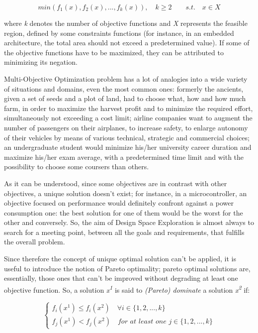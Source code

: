 \begin{equation}
        min( f_1(x), f_2(x), ..., f_k(x) ), \quad k \ge 2 \qquad s.t. \quad x \in X
\end{equation}

where \textit{k} denotes the number of objective functions and \textit{X} represents the feasible region, defined by some constraints functions (for instance, in an embedded architecture, the total area should not exceed a predetermined value). If some of the objective functions have to be maximized, they can be attributed to minimizing its negation.

Multi-Objective Optimization problem has a lot of analogies into a wide variety of situations and domains, even the most common ones: formerly the ancients, given a set of seeds and a plot of land, had to choose what, how and how much farm, in order to maximize the harvest profit and to minimize the required effort, simultaneously not exceeding a cost limit; airline companies want to augment the number of passengers on their airplanes, to increase safety, to enlarge autonomy of their vehicles by means of various technical, strategic and commercial choices; an undergraduate student would minimize his/her university career duration and maximize his/her exam average, with a predetermined time limit and with the possibility to choose some coursers than others.

As it can be understood, since some objectives are in contrast with other objectives, a unique solution doesn't exist; for instance, in a microcontroller, an objective focused on performance would definitely confront against a power consumption one: the best solution for one of them would be the worst for the other and conversely. So, the aim of Design Space Exploration is almost always to search for a meeting point, between all the goals and requirements, that fulfills the overall problem.

Since therefore the concept of unique optimal solution can't be applied, it is useful to introduce the notion of Pareto optimality; pareto optimal solutions are, essentially, those ones that can't be improved without degrading at least one objective function. So, a solution \textit{x\textsuperscript{1}} is said to \textit{(Pareto) dominate} a solution \textit{x\textsuperscript{2}} if:

\begin{equation}
\begin{cases}
        f_i(x^1) \le f_i(x^2) \quad \forall i \in \{1, 2, ..., k\} \\
        f_j(x^1) < f_j(x^2) \quad \textit{for at least one } j \in \{1, 2, ..., k\}
\end{cases}
\end{equation}

